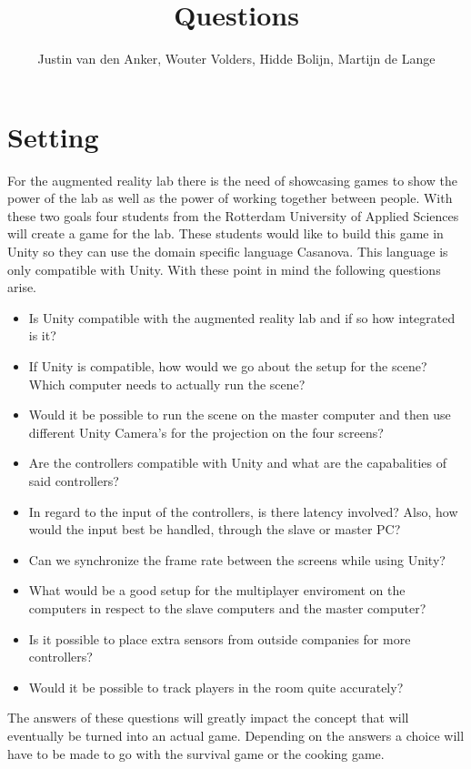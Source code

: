 \documentclass[10pt,a4paper]{article}
\author{Justin van den Anker, Wouter Volders, Hidde Bolijn, Martijn de Lange}
\title{Questions}
\begin{document}
\maketitle

\section{Setting}
For the augmented reality lab there is the need of showcasing games to show the power of the lab as well as the power of working together between people. With these two goals four students from the Rotterdam University of Applied Sciences  will create a game for the lab. These students would like to build this game in Unity so they can use the domain specific language Casanova. This language is only compatible with Unity. With these point in mind the following questions arise.

\begin{itemize}
\item Is Unity compatible with the augmented reality lab and if so how integrated is it?
\item If Unity is compatible, how would we go about the setup for the scene? Which computer needs to actually run the scene?
\item Would it be possible to run the scene on the master computer and then use different Unity Camera's for the projection on the four screens?
\item Are the controllers compatible with Unity and what are the capabalities of said controllers?
\item In regard to the input of the controllers, is there latency involved? Also, how would the input best be handled, through the slave or master PC?
\item Can we synchronize the frame rate between the screens while using Unity?
\item What would be a good setup for the multiplayer enviroment on the computers in respect to the slave computers and the master computer?
\item Is it possible to place extra sensors from outside companies for more controllers?
\item Would it be possible to track players in the room quite accurately?

\end{itemize}
The answers of these questions will greatly impact the concept that will eventually be turned into an actual game. Depending on the answers a choice will have to be made to go with the survival game or the cooking game.
\end{document}
